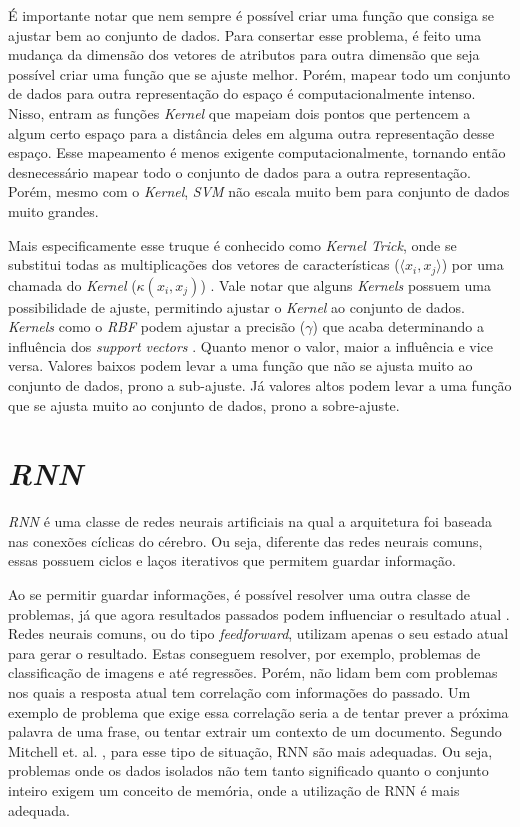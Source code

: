 É importante notar que nem sempre é possível criar uma função que consiga se ajustar bem ao conjunto de dados. Para consertar esse problema, é feito uma mudança da dimensão dos vetores de atributos para outra dimensão que seja possível criar uma função que se ajuste melhor. Porém, mapear todo um conjunto de dados para outra representação do espaço é computacionalmente intenso. Nisso, entram as funções \textit{Kernel} que mapeiam dois pontos que pertencem a algum certo espaço para a distância deles em alguma outra representação desse espaço. Esse mapeamento é menos exigente computacionalmente, tornando então desnecessário mapear todo o conjunto de dados para a outra representação. Porém, mesmo com o \textit{Kernel}, \textit{\acrshort{SVM}} não escala muito bem para conjunto de dados muito grandes. \cite{chollet2018deep}

Mais especificamente esse truque é conhecido como \textit{Kernel Trick}, onde se substitui todas as multiplicações dos vetores de características (\(\langle x_i, x_j \rangle\)) por uma chamada do \textit{Kernel} (\(\kappa(x_i, x_j)\)) \cite{murphy2012machine}. Vale notar que alguns \textit{Kernels} possuem uma possibilidade de ajuste, permitindo ajustar o \textit{Kernel} ao conjunto de dados. \textit{Kernels} como o \textit{\acrfull{RBF}} podem ajustar a precisão (\(\gamma\)) que acaba determinando a influência dos \textit{support vectors} \cite{murphy2012machine}. Quanto menor o valor, maior a influência e vice versa. Valores baixos podem levar a uma função que não se ajusta muito ao conjunto de dados, prono a sub-ajuste. Já valores altos podem levar a uma função que se ajusta muito ao conjunto de dados, prono a sobre-ajuste.

\section{\textit{\acrfull{RNN}}}

\textit{\acrshort{RNN}} é uma classe de redes neurais artificiais na qual a arquitetura foi baseada nas conexões cíclicas do cérebro. Ou seja, diferente das redes neurais comuns, essas possuem ciclos e laços iterativos que permitem guardar informação. \cite{alex2012} 

Ao se permitir guardar informações, é possível resolver uma outra classe de problemas, já que agora resultados passados podem influenciar o resultado atual \cite{alex2012}. Redes neurais comuns, ou do tipo \textit{feedforward}, utilizam apenas o seu estado atual para gerar o resultado. Estas conseguem resolver, por exemplo, problemas de classificação de imagens e até regressões. Porém, não lidam bem com problemas nos quais a resposta atual tem correlação com informações do passado. Um exemplo de problema que exige essa correlação seria a de tentar prever a próxima palavra de uma frase, ou tentar extrair um contexto de um documento.  Segundo Mitchell et. al. \cite{Mitchell_1997}, para esse tipo de situação, {\acrshort{RNN}} são mais adequadas. Ou seja,  problemas onde os dados isolados não tem tanto significado quanto o conjunto inteiro exigem um conceito de memória, onde a utilização de \acrshort{RNN} é mais adequada.

